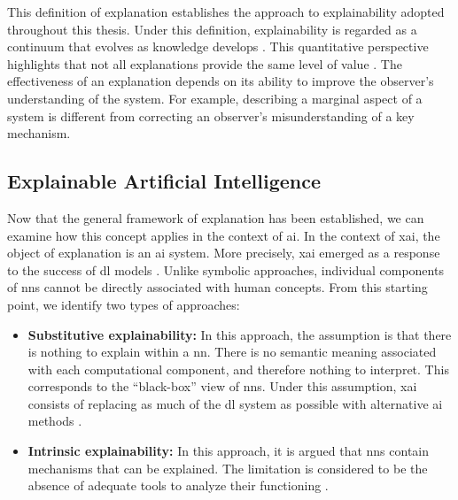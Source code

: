 

This definition of explanation establishes the approach to explainability adopted throughout this thesis.
Under this definition, explainability is regarded as a continuum that evolves as knowledge develops \parencite{Siegel_Craver_2024, zednik2019solving}.
This quantitative perspective highlights that not all explanations provide the same level of value \parencite{doshivelez2017rigorous}.
The effectiveness of an explanation depends on its ability to improve the observer's understanding of the system.
For example, describing a marginal aspect of a system is different from correcting an observer's misunderstanding of a key mechanism.

\subsection{Explainable Artificial Intelligence}
\label{subsec:explainable_artificial_intelligence}

Now that the general framework of explanation has been established, we can examine how this concept applies in the context of \gls{ai}.
In the context of \gls{xai}, the object of explanation is an \gls{ai} system.
More precisely, \gls{xai} emerged as a response to the success of \gls{dl} models \parencite{gunning2019darpa, arrieta2020explainable}.
Unlike symbolic approaches, individual components of \glspl{nn} cannot be directly associated with human concepts.
From this starting point, we identify two types of approaches:
\begin{itemize}
    \item \textbf{Substitutive explainability:} In this approach, the assumption is that there is nothing to explain within a \gls{nn}.
    There is no semantic meaning associated with each computational component, and therefore nothing to interpret.
    This corresponds to the \enquote{black-box} view of \glspl{nn}.
    Under this assumption, \gls{xai} consists of replacing as much of the \gls{dl} system as possible with alternative \gls{ai} methods \parencite{rudin2019stop}.

    \item \textbf{Intrinsic explainability:} In this approach, it is argued that \glspl{nn} contain mechanisms that can be explained.
    The limitation is considered to be the absence of adequate tools to analyze their functioning \parencite{olah2020zoom}.
\end{itemize}

